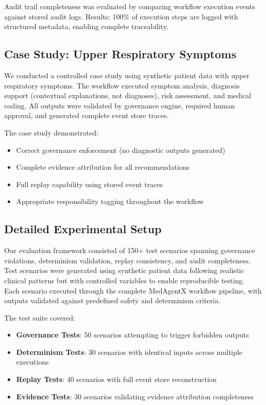 \documentclass[conference]{IEEEtran}
\begin{document}
Audit trail completeness was evaluated by comparing workflow execution events against stored audit logs. Results: 100\% of execution steps are logged with structured metadata, enabling complete traceability.

\subsection{Case Study: Upper Respiratory Symptoms}
We conducted a controlled case study using synthetic patient data with upper respiratory symptoms. The workflow executed symptom analysis, diagnosis support (contextual explanations, not diagnoses), risk assessment, and medical coding. All outputs were validated by governance engine, required human approval, and generated complete event store traces.

The case study demonstrated:
\begin{itemize}
    \item Correct governance enforcement (no diagnostic outputs generated)
    \item Complete evidence attribution for all recommendations
    \item Full replay capability using stored event traces
    \item Appropriate responsibility tagging throughout the workflow
\end{itemize}

\subsection{Detailed Experimental Setup}
Our evaluation framework consisted of 150+ test scenarios spanning governance violations, determinism validation, replay consistency, and audit completeness. Test scenarios were generated using synthetic patient data following realistic clinical patterns but with controlled variables to enable reproducible testing. Each scenario executed through the complete MedAgentX workflow pipeline, with outputs validated against predefined safety and determinism criteria.

The test suite covered:
\begin{itemize}
    \item \textbf{Governance Tests}: 50 scenarios attempting to trigger forbidden outputs
    \item \textbf{Determinism Tests}: 30 scenarios with identical inputs across multiple executions
    \item \textbf{Replay Tests}: 40 scenarios with full event store reconstruction
    \item \textbf{Evidence Tests}: 30 scenarios validating evidence attribution completeness
\end{itemize}
\end{document}
